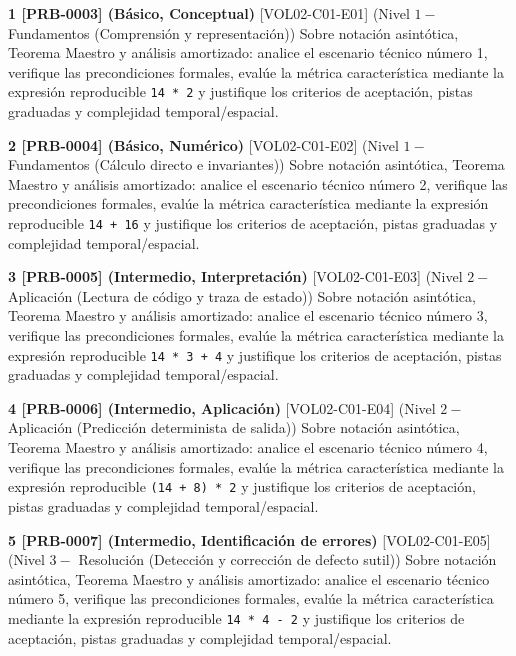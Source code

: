\documentclass{book}
\begin{document}
\begin{tcolorbox}[title={Ejercicios}, studiumworked, breakable]

\noindent\textbf{1 [PRB-0003] (Básico, Conceptual)}
[VOL02-C01-E01] (Nivel \(1 -\) Fundamentos (Comprensión y representación)) Sobre notación asintótica, Teorema Maestro y análisis amortizado: analice el escenario técnico número 1, verifique las precondiciones formales, evalúe la métrica característica mediante la expresión reproducible \texttt{14 * 2} y justifique los criterios de aceptación, pistas graduadas y complejidad temporal/espacial.

\noindent\textbf{2 [PRB-0004] (Básico, Numérico)}
[VOL02-C01-E02] (Nivel \(1 -\) Fundamentos (Cálculo directo e invariantes)) Sobre notación asintótica, Teorema Maestro y análisis amortizado: analice el escenario técnico número 2, verifique las precondiciones formales, evalúe la métrica característica mediante la expresión reproducible \texttt{14 + 16} y justifique los criterios de aceptación, pistas graduadas y complejidad temporal/espacial.

\noindent\textbf{3 [PRB-0005] (Intermedio, Interpretación)}
[VOL02-C01-E03] (Nivel \(2 -\) Aplicación (Lectura de código y traza de estado)) Sobre notación asintótica, Teorema Maestro y análisis amortizado: analice el escenario técnico número 3, verifique las precondiciones formales, evalúe la métrica característica mediante la expresión reproducible \texttt{14 * 3 + 4} y justifique los criterios de aceptación, pistas graduadas y complejidad temporal/espacial.

\noindent\textbf{4 [PRB-0006] (Intermedio, Aplicación)}
[VOL02-C01-E04] (Nivel \(2 -\) Aplicación (Predicción determinista de salida)) Sobre notación asintótica, Teorema Maestro y análisis amortizado: analice el escenario técnico número 4, verifique las precondiciones formales, evalúe la métrica característica mediante la expresión reproducible \texttt{(14 + 8) * 2} y justifique los criterios de aceptación, pistas graduadas y complejidad temporal/espacial.

\noindent\textbf{5 [PRB-0007] (Intermedio, Identificación de errores)}
[VOL02-C01-E05] (Nivel \(3 -\) Resolución (Detección y corrección de defecto sutil)) Sobre notación asintótica, Teorema Maestro y análisis amortizado: analice el escenario técnico número 5, verifique las precondiciones formales, evalúe la métrica característica mediante la expresión reproducible \texttt{14 * 4 - 2} y justifique los criterios de aceptación, pistas graduadas y complejidad temporal/espacial.


\end{tcolorbox}
\end{document}

